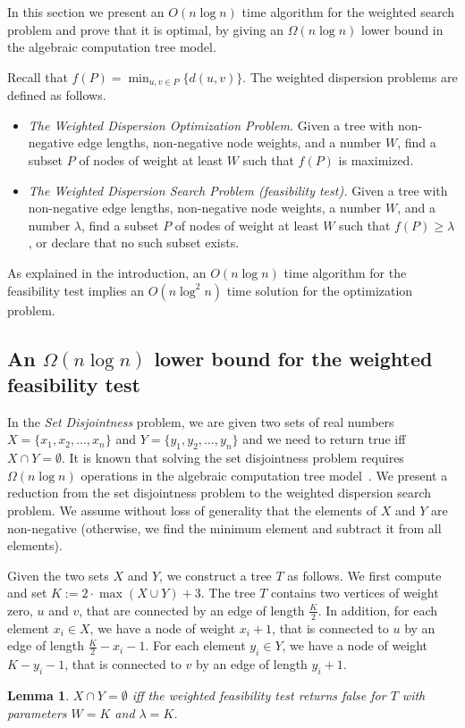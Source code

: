 \documentclass[11pt,a4paper]{article}
\newtheorem{lemma}{Lemma}
\theoremstyle{definition}
\theoremstyle{remark}
\begin{document}
In this section we present an $O(n\log n)$ time algorithm for the weighted search problem and prove that it is optimal, by giving an 
$\Omega(n \log n)$ lower bound in the algebraic computation tree model.

Recall that $f(P)=\min_{u,v\in P}\{d(u,v)\}$. The weighted dispersion problems are defined as follows.
\begin{itemize}
\item  {\em The Weighted Dispersion Optimization Problem.}  Given a tree with non-negative edge lengths, non-negative node weights, and a number $W$, find a subset $P$ of nodes of weight at least $W$ such that  $f(P)$ is maximized. 
\item  {\em The Weighted Dispersion Search Problem (feasibility test).}  Given a tree with non-negative edge lengths, non-negative node weights, a number $W$, and a number $\lambda$, find a subset $P$ of nodes of weight at least $W$ such that  $f(P)\geq\lambda$, or declare that no such subset exists. 
\end{itemize}
As explained in the introduction, an $O(n \log n)$ time algorithm for the feasibility test implies an $O(n\log^{2}n)$ time solution for the optimization problem.
%

\subsection{An \texorpdfstring{\boldmath$ \Omega (n\log n)$}{Omega(nlogn)} lower bound for the weighted feasibility test}\label{weighted f.t. lower bound}

In the {\em Set Disjointness} problem, we are given two sets of real numbers $X=\lbrace x_1,x_2,\ldots,x_n \rbrace$ and $Y=\lbrace y_1,y_2,\ldots,y_n \rbrace$ and we need to return true iff $X \cap Y = \emptyset$. 
It is known that solving the set disjointness problem requires $\Omega(n \log n)$ operations in the algebraic
computation tree model~\cite{BenOr}.
We present a reduction from the set disjointness problem to the weighted dispersion search problem. We assume without loss of generality that the elements of $X$ and $Y$ are non-negative (otherwise,
we find the minimum element and subtract it from all elements).


Given the two sets $X$ and $Y$, we construct a tree $T$ as follows. We first compute and set
$K := 2 \cdot \max (X\cup Y) +3$.
The tree $T$ contains two vertices of weight zero, $u$ and $v$, that are connected by an edge of length $\frac{K}{2}$. In addition, for each element $x_i \in X$, we have a node of weight $x_i+1$, that is connected to $u$ by an edge of length $\frac{K}{2} - x_i -1$. For each element $y_i \in Y$, we have a node of weight $K - y_i -1$, that is connected to $v$ by an edge of length $y_i+1$.
\begin{lemma}\label{lemma of the reduction to set disjointness}
$X \cap Y = \emptyset$ iff the weighted feasibility test returns false for $T$ with  parameters $W=K$ and $\lambda =K$.
\end{lemma}
\end{document}
